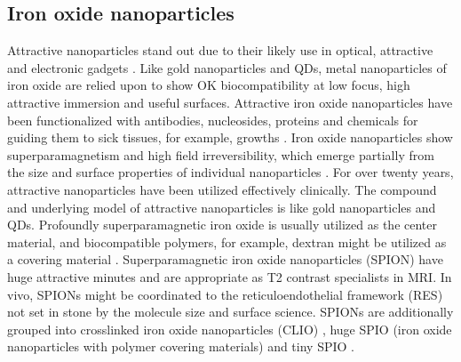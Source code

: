 \documentclass{article}
\begin{document}
\subsection*{ Iron oxide nanoparticles}
Attractive nanoparticles stand out due to their likely use in optical, attractive and electronic gadgets . Like gold nanoparticles and QDs, metal nanoparticles of iron oxide are relied upon to show OK biocompatibility at low focus, high attractive immersion and useful surfaces. Attractive iron oxide nanoparticles have been functionalized with antibodies, nucleosides, proteins and chemicals for guiding them to sick tissues, for example, growths . Iron oxide nanoparticles show superparamagnetism and high field irreversibility, which emerge partially from the size and surface properties of individual nanoparticles . For over twenty years, attractive nanoparticles have been utilized effectively clinically. The compound and underlying model of attractive nanoparticles is like gold nanoparticles and QDs. Profoundly superparamagnetic iron oxide is usually utilized as the center material, and biocompatible polymers, for example, dextran might be utilized as a covering material . Superparamagnetic iron oxide nanoparticles (SPION) have huge attractive minutes and are appropriate as T2 contrast specialists in MRI. In vivo, SPIONs might be coordinated to the reticuloendothelial framework (RES) not set in stone by the molecule size and surface science. SPIONs are additionally grouped into crosslinked iron oxide nanoparticles (CLIO) , huge SPIO (iron oxide nanoparticles with polymer covering materials) and tiny SPIO .
\begin{itemize}
     
    
\end{itemize}





 
 
\end{document}
